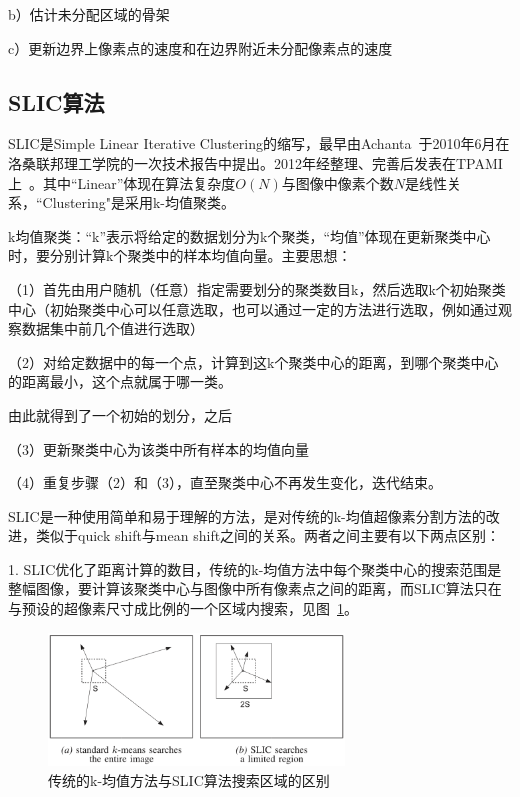 \documentclass[12pt]{article}
\begin{document}
b）估计未分配区域的骨架

c）更新边界上像素点的速度和在边界附近未分配像素点的速度

\subsection{SLIC算法}

SLIC是Simple Linear Iterative Clustering的缩写，最早由Achanta~\cite{achanta2010slic}于2010年6月在洛桑联邦理工学院的一次技术报告中提出。2012年经整理、完善后发表在TPAMI上~\cite{achanta2012slic}。其中“Linear”体现在算法复杂度$O(N)$与图像中像素个数$N$是线性关系，“Clustering"是采用k-均值聚类。

k均值聚类：“k”表示将给定的数据划分为k个聚类，“均值”体现在更新聚类中心时，要分别计算k个聚类中的样本均值向量。主要思想：

（1）首先由用户随机（任意）指定需要划分的聚类数目k，然后选取k个初始聚类中心（初始聚类中心可以任意选取，也可以通过一定的方法进行选取，例如通过观察数据集中前几个值进行选取）

（2）对给定数据中的每一个点，计算到这k个聚类中心的距离，到哪个聚类中心的距离最小，这个点就属于哪一类。

由此就得到了一个初始的划分，之后

（3）更新聚类中心为该类中所有样本的均值向量

（4）重复步骤（2）和（3），直至聚类中心不再发生变化，迭代结束。

SLIC是一种使用简单和易于理解的方法，是对传统的k-均值超像素分割方法的改进，类似于quick shift与mean shift之间的关系。两者之间主要有以下两点区别：

1. SLIC优化了距离计算的数目，传统的k-均值方法中每个聚类中心的搜索范围是整幅图像，要计算该聚类中心与图像中所有像素点之间的距离，而SLIC算法只在与预设的超像素尺寸成比例的一个区域内搜索，见图~\ref{fig: searchregion}。

\begin{figure}[!ht]
\centering
\includegraphics[width=0.7\textwidth]{searchregion.png}
\caption{传统的k-均值方法与SLIC算法搜索区域的区别}
\label{fig: searchregion}
\end{figure} 
\end{document}
